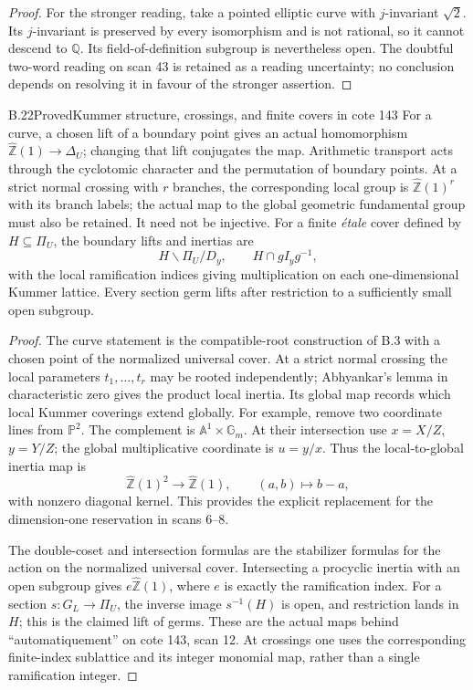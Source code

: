 \begin{proof}
For the stronger reading, take a pointed elliptic curve with
$j$-invariant $\sqrt2$.  Its $j$-invariant is preserved by every
isomorphism and is not rational, so it cannot descend to
$\mathbb Q$.  Its field-of-definition subgroup is nevertheless
open.  The doubtful two-word reading on scan 43 is retained as a
reading uncertainty; no conclusion depends on resolving it in
favour of the stronger assertion.
\end{proof}

\begin{statement}{B.22}{Proved}{Kummer structure, crossings, and finite covers in cote 143}
For a curve, a chosen lift of a boundary point gives an actual
homomorphism $\widehat{\mathbb Z}(1)\to\Delta_U$; changing that lift
conjugates the map.  Arithmetic transport acts through the
cyclotomic character and the permutation of boundary points.
At a strict normal crossing with $r$ branches, the corresponding
local group is $\widehat{\mathbb Z}(1)^r$ with its branch labels;
the actual map to the global geometric fundamental group must
also be retained.  It need not be injective.
For a finite \emph{\'etale} cover defined by $H\subseteq\Pi_U$,
the boundary lifts and inertias are
\[
 H\backslash\Pi_U/D_y,
 \qquad H\cap gI_yg^{-1},
\]
with the local ramification indices giving multiplication on each
one-dimensional Kummer lattice.  Every section germ lifts after
restriction to a sufficiently small open subgroup.
\end{statement}
\begin{proof}
The curve statement is the compatible-root construction of B.3
with a chosen point of the normalized universal cover.
At a strict normal crossing the local parameters
$t_1,\ldots,t_r$ may be rooted independently; Abhyankar's lemma
in characteristic zero gives the product local inertia.  Its
global map records which local Kummer coverings extend globally.
For example, remove two coordinate lines from $\mathbb P^2$.
The complement is $\mathbb A^1\times\mathbb G_m$.  At their
intersection use $x=X/Z$, $y=Y/Z$; the global multiplicative
coordinate is $u=y/x$.  Thus the local-to-global inertia map is
\[
 \widehat{\mathbb Z}(1)^2\longrightarrow\widehat{\mathbb Z}(1),
 \qquad (a,b)\longmapsto b-a,
\]
with nonzero diagonal kernel.  This provides the explicit
replacement for the dimension-one reservation in scans 6--8.

The double-coset and intersection formulas are the stabilizer
formulas for the action on the normalized universal cover.
Intersecting a procyclic inertia with an open subgroup gives
$e\widehat{\mathbb Z}(1)$, where $e$ is exactly the ramification
index.  For a section $s:G_L\to\Pi_U$, the inverse image
$s^{-1}(H)$ is open, and restriction lands in $H$; this is the
claimed lift of germs.  These are the actual maps behind
``automatiquement'' on cote 143, scan 12.  At crossings one uses
the corresponding finite-index sublattice and its integer
monomial map, rather than a single ramification integer.
\end{proof}

